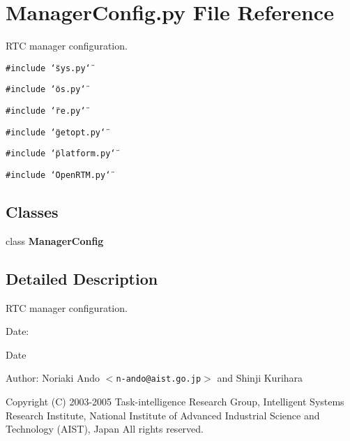 \section{Manager\-Config.py File Reference}
\label{ManagerConfig_8py}
RTC manager configuration. 

{\tt \#include \char`\"{}sys.py\char`\"{}}\par
{\tt \#include \char`\"{}os.py\char`\"{}}\par
{\tt \#include \char`\"{}re.py\char`\"{}}\par
{\tt \#include \char`\"{}getopt.py\char`\"{}}\par
{\tt \#include \char`\"{}platform.py\char`\"{}}\par
{\tt \#include \char`\"{}Open\-RTM.py\char`\"{}}\par
\subsection*{Classes}
\begin{CompactItemize}
\item 
class {\bf Manager\-Config}
\end{CompactItemize}


\subsection{Detailed Description}
RTC manager configuration. 

\begin{Desc}
\item[Date:]\begin{Desc}
\item[Date]\end{Desc}
\end{Desc}
\begin{Desc}
\item[Author:]Noriaki Ando $<${\tt n-ando@aist.go.jp}$>$ and Shinji Kurihara\end{Desc}
Copyright (C) 2003-2005 Task-intelligence Research Group, Intelligent Systems Research Institute, National Institute of Advanced Industrial Science and Technology (AIST), Japan All rights reserved.